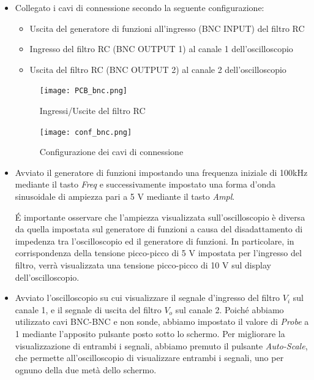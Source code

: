\begin{itemize}
    \item Collegato i cavi di connessione secondo la seguente configurazione:
    \begin{itemize}
        \item Uscita del generatore di funzioni all'ingresso (BNC INPUT) del filtro RC
        \item Ingresso del filtro RC (BNC OUTPUT 1) al canale 1 dell'oscilloscopio
        \item Uscita del filtro RC (BNC OUTPUT 2) al canale 2 dell'oscilloscopio
    \end{itemize}
    \begin{figure}[h]
        \centering
        \texttt{[image: PCB\_bnc.png]}
        \caption{Ingressi/Uscite del filtro RC}
        \label{fig:pcb_bnc}
    \end{figure}
    \begin{figure}[h]
        \centering
        \texttt{[image: conf\_bnc.png]}
        \caption{Configurazione dei cavi di connessione}
        \label{fig:conf_bnc}
    \end{figure}
    \FloatBarrier

    \item Avviato il generatore di funzioni impostando una frequenza iniziale di 100kHz mediante il tasto \emph{Freq} e successivamente impostato una forma d'onda sinusoidale di ampiezza pari a 5 V mediante il tasto \emph{Ampl}.
    
    \'E importante osservare che l'ampiezza visualizzata sull'oscilloscopio è diversa da quella impostata sul generatore di funzioni a causa del disadattamento di impedenza tra l'oscilloscopio ed il generatore di funzioni. In particolare, in corrispondenza della tensione picco-picco di 5 V impostata per l'ingresso del filtro, verrà visualizzata una tensione picco-picco di 10 V sul display dell'oscilloscopio.
    \item Avviato l'oscilloscopio su cui visualizzare il segnale d'ingresso del filtro $V_i$ sul canale 1, e il segnale di uscita del filtro $V_o$ sul canale 2.
    Poiché abbiamo utilizzato cavi BNC-BNC e non sonde, abbiamo impostato il valore di \emph{Probe} a 1 mediante l'apposito pulsante posto sotto lo schermo.
    Per migliorare la visualizzazione di entrambi i segnali, abbiamo premuto il pulsante \emph{Auto-Scale}, che permette all'oscilloscopio di visualizzare entrambi i segnali, uno per ognuno della due metà dello schermo.
    

\end{itemize}
